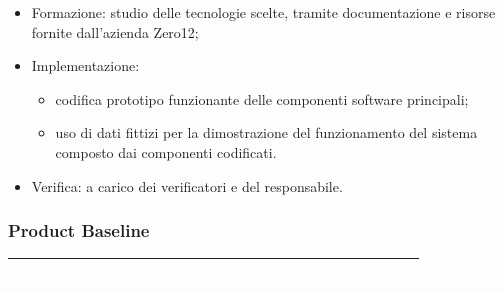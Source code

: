 {{\begin{itemize}
            \begin{itemize}
                \item Formazione: studio delle tecnologie scelte, tramite documentazione e risorse fornite dall'azienda Zero12;
                \item Implementazione: 
                    \begin{itemize}
                        \item codifica prototipo funzionante delle componenti software principali;
                        \item uso di dati fittizi per la dimostrazione del funzionamento del sistema composto dai componenti codificati.
                    \end{itemize}
                \item Verifica: a carico dei verificatori e del responsabile.
            \end{itemize}
    \end{itemize}
    
    \subsubsection{Product Baseline} {
        \setlength{\freewidth}{\dimexpr\textwidth-30\tabcolsep}
        \renewcommand{\arraystretch}{1.0}
        \setlength{\aboverulesep}{0pt}
        \setlength{\belowrulesep}{0pt}
        \begin{longtable}{C{.4\freewidth} C{.4\freewidth}}
        \toprule
        \textcolor{white}{\textbf{Data previsione inizio}}&
        \textcolor{white}{\textbf{Data previsione revisione}} \\
        \toprule
        \endhead
            

\end{longtable}}}}
